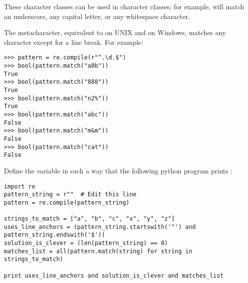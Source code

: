 These character classes can be used in character classes; for example,  will match an underscore, any capital letter, or any whitespace character.

The  metacharacter, equivalent to  on UNIX and  on Windows, matches any character except for a line break.
For example:
\begin{lstlisting}
>>> pattern = re.compile(r"^.\d.$")
>>> bool(pattern.match("a0b"))
True
>>> bool(pattern.match("888"))
True
>>> bool(pattern.match("n2%"))
True
>>> bool(pattern.match("abc"))
False
>>> bool(pattern.match("m&m"))
False
>>> bool(pattern.match("cat"))
False
\end{lstlisting}

\begin{problem}
Define the variable  in such a way that the following python program prints :

\begin{lstlisting}
import re
pattern_string = r""  # Edit this line
pattern = re.compile(pattern_string)

strings_to_match = ["a", "b", "c", "x", "y", "z"]
uses_line_anchors = (pattern_string.startswith('^') and pattern_string.endswith('$'))
solution_is_clever = (len(pattern_string) == 8)
matches_list = all(pattern.match(string) for string in strings_to_match)

print uses_line_anchors and solution_is_clever and matches_list
\end{lstlisting}
\end{problem}

